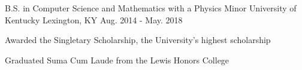 

\begin{cventries}

  \cventry
    {B.S. in Computer Science and Mathematics with a Physics Minor} %
    {University of Kentucky} %
    {Lexington, KY} %
    {Aug. 2014 - May. 2018} %
    {
      \begin{cvitems} %
        \item {Awarded the Singletary Scholarship, the University's highest scholarship}
	\item {Graduated Suma Cum Laude from the Lewis Honors College}
      \end{cvitems}
    }

\end{cventries}

